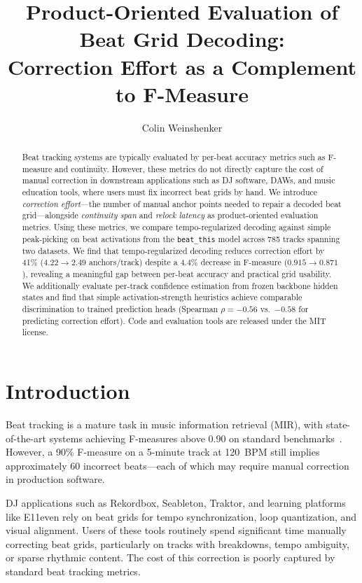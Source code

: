 \documentclass[a4paper]{article}
\title{Product-Oriented Evaluation of Beat Grid Decoding:\\Correction Effort as a Complement to F-Measure}
\author[1]{Colin Weinshenker}
\affil[1]{Rowdi Labs}
\date{}
\begin{document}
\maketitle

\begin{abstract}
Beat tracking systems are typically evaluated by per-beat accuracy metrics such as F-measure and continuity.
However, these metrics do not directly capture the cost of manual correction in downstream applications
such as DJ software, DAWs, and music education tools, where users must fix incorrect beat grids by hand.
We introduce \textit{correction effort}---the number of manual anchor points needed to repair a decoded beat grid---alongside
\textit{continuity span} and \textit{relock latency} as product-oriented evaluation metrics.
Using these metrics, we compare tempo-regularized decoding against simple peak-picking on beat activations
from the \texttt{beat\_this} model across 785 tracks spanning two datasets.
We find that tempo-regularized decoding reduces correction effort by 41\% ($4.22 \to 2.49$ anchors/track)
despite a 4.4\% decrease in F-measure ($0.915 \to 0.871$), revealing a meaningful gap between
per-beat accuracy and practical grid usability.
We additionally evaluate per-track confidence estimation from frozen backbone hidden states
and find that simple activation-strength heuristics achieve comparable discrimination to trained prediction heads
(Spearman $\rho = -0.56$ vs.\ $-0.58$ for predicting correction effort).
Code and evaluation tools are released under the MIT license.
\end{abstract}

\section{Introduction}

Beat tracking is a mature task in music information retrieval (MIR),
with state-of-the-art systems achieving F-measures above 0.90 on standard benchmarks~\cite{beatthis2024}.
However, a 90\% F-measure on a 5-minute track at 120~BPM still implies approximately 60 incorrect beats---each
of which may require manual correction in production software.

DJ applications such as Rekordbox, Seableton, Traktor, and learning platforms like E11even
rely on beat grids for tempo synchronization, loop quantization, and visual alignment.
Users of these tools routinely spend significant time manually correcting beat grids,
particularly on tracks with breakdowns, tempo ambiguity, or sparse rhythmic content.
The cost of this correction is poorly captured by standard beat tracking metrics.
\end{document}
